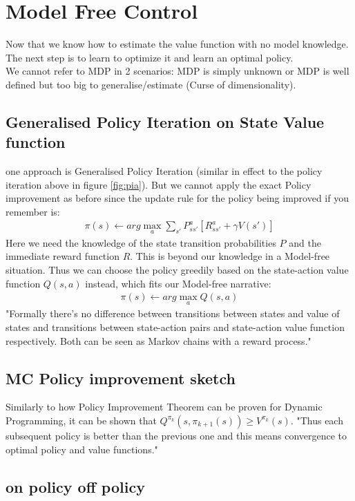 \section{Model Free Control }
Now that we know how to estimate the value function with no model knowledge. The next step is to learn to optimize it and learn an optimal policy. \\

We cannot refer to MDP in 2 scenarios: MDP is simply unknown or MDP is well defined but too big to generalise/estimate (Curse of dimensionality).

\subsection{Generalised Policy Iteration on State Value function} one approach is Generalised Policy Iteration (similar in effect to the policy iteration above in figure \ref{fig:pia}). But we cannot apply the exact Policy improvement as before since the update rule for the policy being improved if you remember is: 
\begin{align}
    \pi(s) \leftarrow arg \max_{a} \sum_{s'} P^{a}_{ss'} [R^{a}_{ss'} + \gamma V(s')]
\end{align}
Here we need the knowledge of the state transition probabilities $P$ and the immediate reward function $R$. This is beyond our knowledge in a Model-free situation. Thus we can choose the policy greedily based on the state-action value function $Q(s, a)$ instead, which fits our Model-free narrative:  
\begin{align}
    \pi(s) \leftarrow arg \max_{a} Q(s, a) 
\end{align}
"Formally there's no difference between transitions between states and value of states and transitions between state-action pairs and state-action value function respectively. Both can be seen as Markov chains with a reward process."
\subsection{MC Policy improvement sketch}

Similarly to how Policy Improvement Theorem can be proven for Dynamic Programming, it can be shown that $Q^{\pi_k}(s, \pi_{k+1}(s)) \geq V^{\pi_k}(s)$. "Thus each subsequent policy is better than the previous one and this means convergence to optimal policy and value functions." 

\subsection{on policy off policy}

